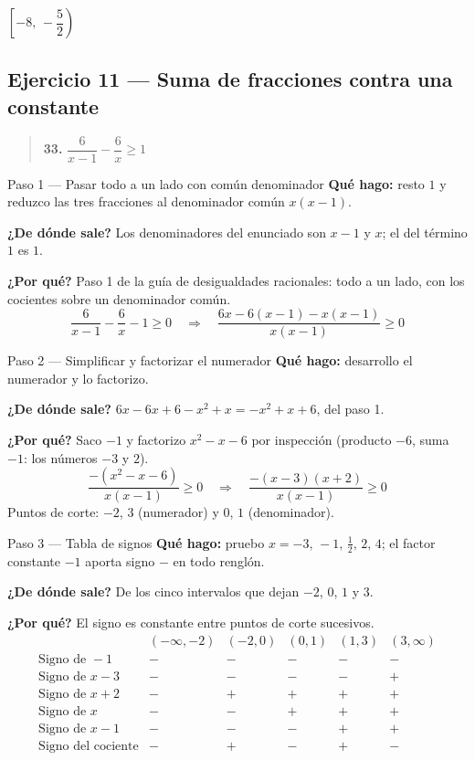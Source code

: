 \documentclass[11pt]{article}
\begin{document}
\begin{resp}
$\left[-8,\,-\dfrac{5}{2}\right)$
\end{resp}

\subsection*{Ejercicio 11 — Suma de fracciones contra una constante}

\begin{quote}
\textbf{33.} $\dfrac{6}{x-1}-\dfrac{6}{x}\ge 1$
\end{quote}

\begin{paso}{Paso 1 --- Pasar todo a un lado con común denominador}
\textbf{Qué hago:} resto $1$ y reduzco las tres fracciones al denominador común $x(x-1)$.

\textbf{¿De dónde sale?} Los denominadores del enunciado son $x-1$ y $x$; el del término $1$ es $1$.

\textbf{¿Por qué?} Paso 1 de la guía de desigualdades racionales: todo a un lado, con los cocientes sobre un denominador común.
\[
\frac{6}{x-1}-\frac{6}{x}-1\ge 0
\quad\Longrightarrow\quad
\frac{6x-6(x-1)-x(x-1)}{x(x-1)}\ge 0
\]
\end{paso}

\begin{paso}{Paso 2 --- Simplificar y factorizar el numerador}
\textbf{Qué hago:} desarrollo el numerador y lo factorizo.

\textbf{¿De dónde sale?} $6x-6x+6-x^2+x=-x^2+x+6$, del paso 1.

\textbf{¿Por qué?} Saco $-1$ y factorizo $x^2-x-6$ por inspección (producto $-6$, suma $-1$: los números $-3$ y $2$).
\[
\frac{-(x^2-x-6)}{x(x-1)}\ge 0
\quad\Longrightarrow\quad
\frac{-(x-3)(x+2)}{x(x-1)}\ge 0
\]
Puntos de corte: $-2$, $3$ (numerador) y $0$, $1$ (denominador).
\end{paso}

\begin{paso}{Paso 3 --- Tabla de signos}
\textbf{Qué hago:} pruebo $x=-3,\,-1,\,\tfrac12,\,2,\,4$; el factor constante $-1$ aporta signo $-$ en todo renglón.

\textbf{¿De dónde sale?} De los cinco intervalos que dejan $-2$, $0$, $1$ y $3$.

\textbf{¿Por qué?} El signo es constante entre puntos de corte sucesivos.
\[
\begin{array}{l|ccccc}
 & (-\infty,-2) & (-2,0) & (0,1) & (1,3) & (3,\infty)\\\hline
\text{Signo de } -1 & - & - & - & - & -\\
\text{Signo de } x-3 & - & - & - & - & +\\
\text{Signo de } x+2 & - & + & + & + & +\\
\text{Signo de } x & - & - & + & + & +\\
\text{Signo de } x-1 & - & - & - & + & +\\\hline
\text{Signo del cociente} & - & + & - & + & -
\end{array}
\]
\end{paso}
\end{document}
